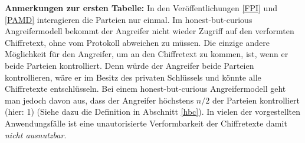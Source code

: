 \textbf{Anmerkungen zur ersten Tabelle:}
In den Veröffentlichungen \ref{FPI} und \ref{PAMD} interagieren die Parteien nur einmal. Im honest-but-curious Angreifermodell bekommt der Angreifer nicht wieder Zugriff auf den verformten Chiffretext, ohne vom Protokoll abweichen zu müssen. Die einzige andere Möglichkeit für den Angreifer, um an den Chiffretext zu kommen, ist, wenn er beide Parteien kontrolliert. Denn würde der Angreifer beide Parteien kontrollieren, wäre er im Besitz des privaten Schlüssels und könnte alle Chiffretexte entschlüsseln. Bei einem honest-but-curious Angreifermodell geht man jedoch davon aus, dass der Angreifer höchstens $n/2$ der Parteien kontrolliert (hier: 1) (Siehe dazu die Definition in Abschnitt \ref{hbc}).  In vielen der vorgestellten Anwendungsfälle ist eine unautorisierte Verformbarkeit der Chiffretexte damit \textit{nicht ausnutzbar}.

